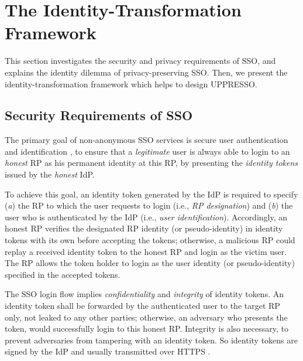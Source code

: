 \section{The Identity-Transformation Framework}
\label{sec:challenge}

This section investigates the security and privacy requirements of SSO,
    and explains the identity dilemma of privacy-preserving SSO.
Then,
    we present the identity-transformation framework which helps to design UPPRESSO.

\subsection{Security Requirements of SSO}
\label{subsec:basicrequirements}

The primary goal of non-anonymous SSO services is secure user authentication and identification \cite{SPRESSO},
 to ensure that a \emph{legitimate} user is always able to login to an \emph{honest} RP as his permanent identity at this RP, %
    by presenting the \emph{identity tokens} issued by the \emph{honest} IdP.

To achieve this goal,
 an identity token generated by the IdP is required to specify (\emph{a}) the RP to which the user requests to login (i.e., \emph{RP designation})
    and  (\emph{b}) the user who is authenticated by the IdP (i.e., \emph{user identification}).
Accordingly,
    an honest RP verifies the designated RP identity (or pseudo-identity) in identity tokens with its own before accepting the tokens;
     otherwise,
        a malicious RP could replay a received identity token to the honest RP and login as the victim user.
The RP allows the token holder to login as the user identity (or pseudo-identity) specified in the accepted tokens.

The SSO login flow implies \emph{confidentiality} and \emph{integrity} of identity tokens.
An identity token shall be forwarded by the authenticated user to the target RP only,
    not leaked to any other parties;
        otherwise, an adversary who presents the token, would successfully login to this honest RP.
Integrity is also necessary,
    to prevent adversaries from tampering with an identity token.
So identity tokens are signed by the IdP and usually transmitted over HTTPS \cite{OpenIDConnect,rfc6749,SAML}.

